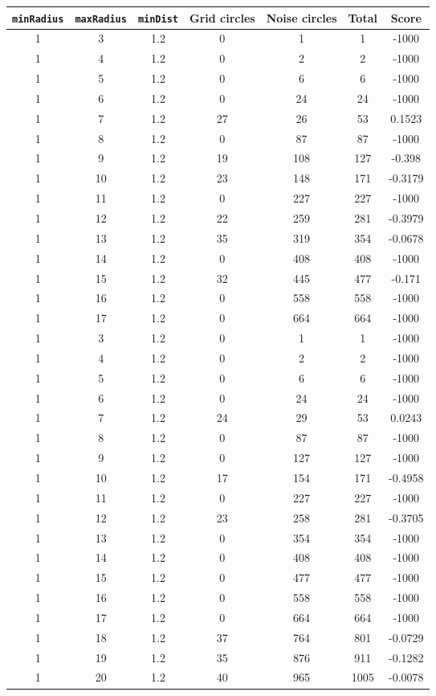 \documentclass[letterpaper, 12pt]{article}
\begin{document}
\begin{longtable}{|c|c|c|c|c|c|c|}
\hline
\textbf{\texttt{minRadius}} & \textbf{\texttt{maxRadius}} & \textbf{\texttt{minDist}} & \textbf{Grid circles} & \textbf{Noise circles} & \textbf{Total} & \textbf{Score} \\
\hline
1 & 3 & 1.2 & 0 & 1 & 1 & -1000 \\
\hline
1 & 4 & 1.2 & 0 & 2 & 2 & -1000 \\
\hline
1 & 5 & 1.2 & 0 & 6 & 6 & -1000 \\
\hline
1 & 6 & 1.2 & 0 & 24 & 24 & -1000 \\
\hline
1 & 7 & 1.2 & 27 & 26 & 53 & 0.1523 \\
\hline
1 & 8 & 1.2 & 0 & 87 & 87 & -1000 \\
\hline
1 & 9 & 1.2 & 19 & 108 & 127 & -0.398 \\
\hline
1 & 10 & 1.2 & 23 & 148 & 171 & -0.3179 \\
\hline
1 & 11 & 1.2 & 0 & 227 & 227 & -1000 \\
\hline
1 & 12 & 1.2 & 22 & 259 & 281 & -0.3979 \\
\hline
1 & 13 & 1.2 & 35 & 319 & 354 & -0.0678 \\
\hline
1 & 14 & 1.2 & 0 & 408 & 408 & -1000 \\
\hline
1 & 15 & 1.2 & 32 & 445 & 477 & -0.171 \\
\hline
1 & 16 & 1.2 & 0 & 558 & 558 & -1000 \\
\hline
1 & 17 & 1.2 & 0 & 664 & 664 & -1000 \\
\hline
1 & 3 & 1.2 & 0 & 1 & 1 & -1000 \\
\hline
1 & 4 & 1.2 & 0 & 2 & 2 & -1000 \\
\hline
1 & 5 & 1.2 & 0 & 6 & 6 & -1000 \\
\hline
1 & 6 & 1.2 & 0 & 24 & 24 & -1000 \\
\hline
1 & 7 & 1.2 & 24 & 29 & 53 & 0.0243 \\
\hline
1 & 8 & 1.2 & 0 & 87 & 87 & -1000 \\
\hline
1 & 9 & 1.2 & 0 & 127 & 127 & -1000 \\
\hline
1 & 10 & 1.2 & 17 & 154 & 171 & -0.4958 \\
\hline
1 & 11 & 1.2 & 0 & 227 & 227 & -1000 \\
\hline
1 & 12 & 1.2 & 23 & 258 & 281 & -0.3705 \\
\hline
1 & 13 & 1.2 & 0 & 354 & 354 & -1000 \\
\hline
1 & 14 & 1.2 & 0 & 408 & 408 & -1000 \\
\hline
1 & 15 & 1.2 & 0 & 477 & 477 & -1000 \\
\hline
1 & 16 & 1.2 & 0 & 558 & 558 & -1000 \\
\hline
1 & 17 & 1.2 & 0 & 664 & 664 & -1000 \\
\hline
1 & 18 & 1.2 & 37 & 764 & 801 & -0.0729 \\
\hline
1 & 19 & 1.2 & 35 & 876 & 911 & -0.1282 \\
\hline
1 & 20 & 1.2 & 40 & 965 & 1005 & -0.0078 \\
\hline
\end{longtable}
\end{document}
